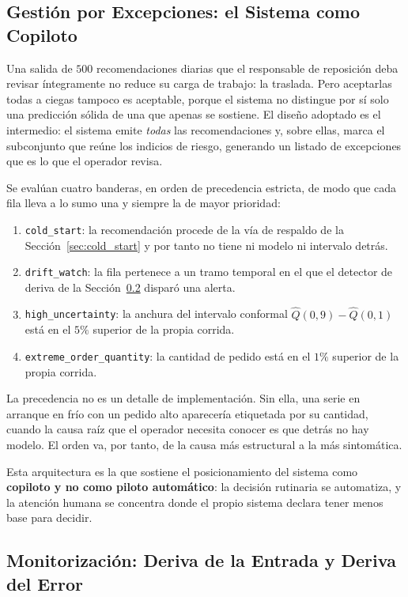\subsection{Gestión por Excepciones: el Sistema como Copiloto}
\label{sec:excepciones}

Una salida de $500$ recomendaciones diarias que el responsable de reposición deba revisar íntegramente no reduce su carga de trabajo: la traslada. Pero aceptarlas todas a ciegas tampoco es aceptable, porque el sistema no distingue por sí solo una predicción sólida de una que apenas se sostiene. El diseño adoptado es el intermedio: el sistema emite \emph{todas} las recomendaciones y, sobre ellas, marca el subconjunto que reúne los indicios de riesgo, generando un listado de excepciones que es lo que el operador revisa.

Se evalúan cuatro banderas, en orden de precedencia estricta, de modo que cada fila lleva a lo sumo una y siempre la de mayor prioridad:

\begin{enumerate}
    \item \texttt{cold\_start}: la recomendación procede de la vía de respaldo de la Sección~\ref{sec:cold_start} y por tanto no tiene ni modelo ni intervalo detrás.
    \item \texttt{drift\_watch}: la fila pertenece a un tramo temporal en el que el detector de deriva de la Sección~\ref{sec:monitorizacion} disparó una alerta.
    \item \texttt{high\_uncertainty}: la anchura del intervalo conformal $\hat{Q}(0{,}9) - \hat{Q}(0{,}1)$ está en el $5\%$ superior de la propia corrida.
    \item \texttt{extreme\_order\_quantity}: la cantidad de pedido está en el $1\%$ superior de la propia corrida.
\end{enumerate}

La precedencia no es un detalle de implementación. Sin ella, una serie en arranque en frío con un pedido alto aparecería etiquetada por su cantidad, cuando la causa raíz que el operador necesita conocer es que detrás no hay modelo. El orden va, por tanto, de la causa más estructural a la más sintomática.

Esta arquitectura es la que sostiene el posicionamiento del sistema como \textbf{copiloto y no como piloto automático}: la decisión rutinaria se automatiza, y la atención humana se concentra donde el propio sistema declara tener menos base para decidir.

\subsection{Monitorización: Deriva de la Entrada y Deriva del Error}
\label{sec:monitorizacion}

